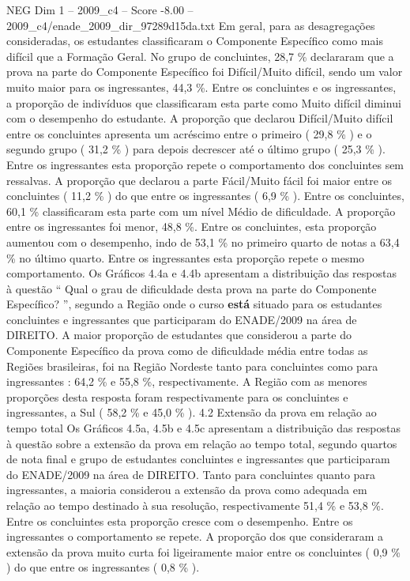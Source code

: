 \begin{textsample}{NEG Dim 1 – 2009\_c4 – Score -8.00 – 2009\_c4/enade\_2009\_dir\_97289d15da.txt}
Em geral, para as desagregações consideradas, os estudantes classificaram o Componente Específico como mais difícil que a Formação Geral.
No grupo de concluintes, 28,7 \% declararam que a prova na parte do Componente Específico foi Difícil/Muito difícil, sendo um valor muito maior para os ingressantes, 44,3 \%.
Entre os concluintes e os ingressantes, a proporção de indivíduos que classificaram esta parte como Muito difícil diminui com o desempenho do estudante.
A proporção que declarou Difícil/Muito difícil entre os concluintes apresenta um acréscimo entre o primeiro ( 29,8 \% ) e o segundo grupo ( 31,2 \% ) para depois decrescer até o último grupo ( 25,3 \% ).
Entre os ingressantes esta proporção repete o comportamento dos concluintes sem ressalvas.
A proporção que declarou a parte Fácil/Muito fácil foi maior entre os concluintes ( 11,2 \% ) do que entre os ingressantes ( 6,9 \% ).
Entre os concluintes, 60,1 \% classificaram esta parte com um nível Médio de dificuldade.
A proporção entre os ingressantes foi menor, 48,8 \%.
Entre os concluintes, esta proporção aumentou com o desempenho, indo de 53,1 \% no primeiro quarto de notas a 63,4 \% no último quarto.
Entre os ingressantes esta proporção repete o mesmo comportamento.
Os Gráficos 4.4a e 4.4b apresentam a distribuição das respostas à questão “ Qual o grau de dificuldade desta prova na parte do Componente Específico? ”, segundo a Região onde o curso \textbf{está} situado para os estudantes concluintes e ingressantes que participaram do ENADE/2009 na área de DIREITO.
A maior proporção de estudantes que considerou a parte do Componente Específico da prova como de dificuldade média entre todas as Regiões brasileiras, foi na Região Nordeste tanto para concluintes como para ingressantes : 64,2 \% e 55,8 \%, respectivamente.
A Região com as menores proporções desta resposta foram respectivamente para os concluintes e ingressantes, a Sul ( 58,2 \% e 45,0 \% ). 4.2 Extensão da prova em relação ao tempo total Os Gráficos 4.5a, 4.5b e 4.5c apresentam a distribuição das respostas à questão sobre a extensão da prova em relação ao tempo total, segundo quartos de nota final e grupo de estudantes concluintes e ingressantes que participaram do ENADE/2009 na área de DIREITO.
Tanto para concluintes quanto para ingressantes, a maioria considerou a extensão da prova como adequada em relação ao tempo destinado à sua resolução, respectivamente 51,4 \% e 53,8 \%.
Entre os concluintes esta proporção cresce com o desempenho.
Entre os ingressantes o comportamento se repete.
A proporção dos que consideraram a extensão da prova muito curta foi ligeiramente maior entre os concluintes ( 0,9 \% ) do que entre os ingressantes ( 0,8 \% ).

\end{textsample}
